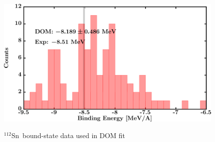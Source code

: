 \documentclass[twocolumn,secnumarabic,amssymb, nobibnotes, aps, prl,
superscriptaddress, nobalancelastpage, draft]{revtex4}
\newcommand{\snTwelve}{\ensuremath{^{112}}S\lowercase{n}}
\begin{document}
\begin{figure}[!htb]
\begin{minipage}{0.4\linewidth}
        \label{DOM_sn112_RMSRadius}
    \end{minipage}
    \begin{minipage}{0.4\linewidth}
        \centering
        \includegraphics[width=\linewidth]{figures/sn112_BE.png}
        \label{DOM_sn112_BE}
    \end{minipage}
    \caption{\snTwelve\ bound-state data used in DOM fit}
    \label{DOM_sn112_structural}
\end{figure}
\end{document}
